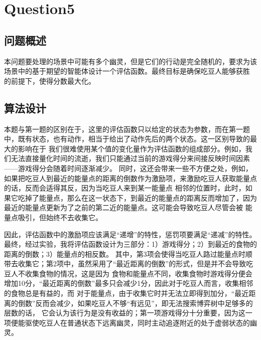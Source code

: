 \chapter{Question5}
\section{问题概述}
%
%
本问题要处理的场景中可能有多个幽灵，但是它们的行动是完全随机的，要求为该场景中的基于期望的智能体设计一个评估函数。最终目标是确保吃豆人能够获胜
的前提下，使得分数最大化。

%
%

%
%

\section{算法设计}
%
%
本题与第一题的区别在于，这里的评估函数只以给定的状态为参数，而在第一题中，既有状态，也有动作，相当于给出了动作先后的两个状态。这一区别导致的最大的影响在于
我们很难使用某个值的变化量作为评估函数的组成部分。例如，我们无法直接量化时间的流逝，我们只能通过当前的游戏得分来间接反映时间因素——游戏得分会随着时间逐渐减少。
同时，这还会带来一些不方便之处，例如，如果把吃豆人到最近的能量点的距离的倒数作为激励项，来激励吃豆人获取能量点的话，反而会适得其反，因为当吃豆人来到某一能量点
相邻的位置时，此时，如果它吃掉了能量点，那么在这一状态下，到最近的能量点的距离反而增加了，因为最近的能量点更新为了之前的第二近的能量点。这可能会导致吃豆人尽管会被
能量点吸引，但始终不去收集它。

因此，评估函数中的激励项应该满足“递增”的特性，惩罚项要满足“递减”的特性。最终，经过实验，我将评估函数设计为三部分：1）游戏得分；2）到最近的食物的距离的倒数；3）能量点的相反数。
其中，第3项会使得当吃豆人路过能量点时顺带去收集它；第2项中，虽然采用了“最近距离的倒数”的形式，但是并不会导致吃豆人不收集食物的情况，这是因为
食物和能量点不同，收集食物时游戏得分便会增加10分，“最近距离的倒数”最多只会减少1分，因此对于吃豆人而言，收集相邻的食物总是有益的，而
对于能量点，由于收集它时并无法立即得到加分，“最近距离的倒数”反而会减少，如果吃豆人不够“有远见”，即无法搜索博弈树中足够多的层数的话，
它会认为该行为是没有收益的；第一项游戏得分十分重要，因为这一项便能驱使吃豆人在普通状态下远离幽灵，同时主动追逐附近的处于虚弱状态的幽灵。
